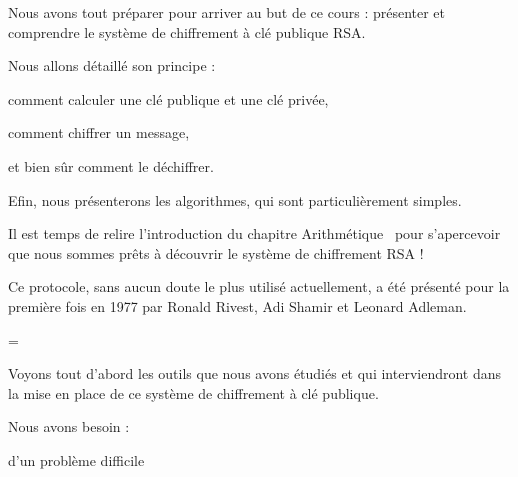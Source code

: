




\newcommand{\prive}[1]{{\bf\color{coul_prive} #1}}
\newcommand{\public}[1]{{\bf\color{coul_public} #1}}




\debuttexte


\diapo

Nous avons tout préparer pour arriver au but de ce cours : présenter et comprendre le système de chiffrement à clé publique RSA.

\change

Nous allons détaillé son principe :

\change

comment calculer une clé publique et une clé privée,

\change

comment chiffrer un message,

\change

et bien sûr comment le déchiffrer.



\change

Efin, nous présenterons les algorithmes, qui sont particulièrement simples.

\diapo



Il est temps de relire l'introduction du 
chapitre \og Arithmétique \fg\ pour s'apercevoir
que nous sommes prêts à découvrir le système de chiffrement RSA !

Ce protocole, sans aucun doute le plus utilisé actuellement, a été présenté pour la première fois en 1977 par Ronald Rivest, Adi Shamir et Leonard Adleman.

=

Voyons tout d'abord les outils que nous avons étudiés et qui interviendront dans la mise en place de ce système de chiffrement à clé publique.

Nous avons besoin :


d'un problème difficile 

